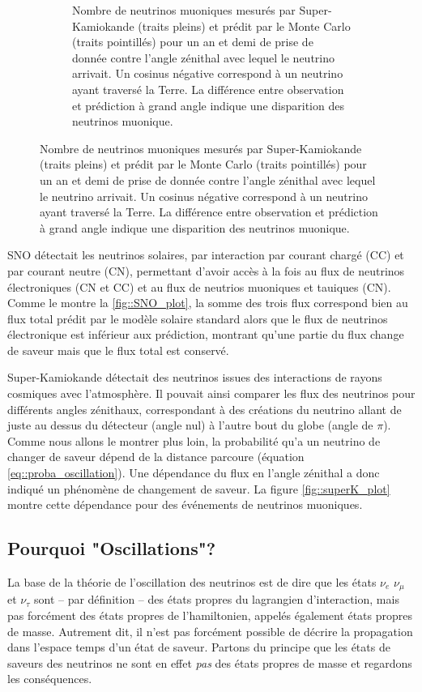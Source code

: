 \begin{figure}[htbp]
\begin{subfigure}[t]{0.4\textwidth}
                    \caption{Nombre de neutrinos muoniques mesurés par Super-Kamiokande (traits pleins) et prédit par le Monte Carlo (traits pointillés) pour un an et demi de prise de donnée contre l'angle zénithal avec lequel le neutrino arrivait\cite{Fukuda1998}. Un cosinus négative correspond à un neutrino ayant traversé la Terre. La différence entre observation et prédiction à grand angle indique une disparition des neutrinos muonique.}
                    \label{fig::superK_plot}
                \end{subfigure}
            \end{figure}
            
            SNO détectait les neutrinos solaires, par interaction par courant chargé (CC) et par courant neutre (CN), permettant d'avoir accès à la fois au flux de neutrinos électroniques (CN et CC) et au flux de neutrios muoniques et tauiques (CN). Comme le montre la \autoref{fig::SNO_plot}, la somme des trois flux correspond bien au flux total prédit par le modèle solaire standard alors que le flux de neutrinos électronique est inférieur aux prédiction, montrant qu'une partie du flux change de saveur mais que le flux total est conservé.
            
            Super-Kamiokande détectait des neutrinos issues des interactions de rayons cosmiques avec l'atmosphère. Il pouvait ainsi comparer les flux des neutrinos pour différents angles zénithaux, correspondant à des créations du neutrino allant de juste au dessus du détecteur (angle nul) à l'autre bout du globe (angle de $\pi$). Comme nous allons le montrer plus loin, la probabilité qu'a un neutrino de changer de saveur dépend de la distance parcoure (équation \eqref{eq::proba_oscillation}). Une dépendance du flux en l'angle zénithal a donc indiqué un phénomène de changement de saveur. La figure \autoref{fig::superK_plot} montre cette dépendance pour des événements de neutrinos muoniques.
    
        \subsection{Pourquoi "Oscillations"?}
            La base de la théorie de l'oscillation des neutrinos est de dire que les états $\nu_e$ $\nu_{\mu}$ et $\nu_{\tau}$ sont -- par définition -- des états propres du lagrangien d'interaction, mais pas forcément des états propres de l'hamiltonien, appelés également états propres de masse. Autrement dit, il n'est pas forcément possible de décrire la propagation dans l'espace temps d'un état de saveur. Partons du principe que les états de saveurs des neutrinos ne sont en effet \textit{pas} des états propres de masse et regardons les conséquences. 
            
